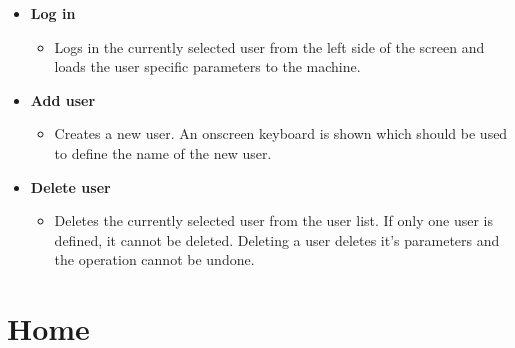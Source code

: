 \documentclass[12pt,a4paper,english]{uvmanual}
\begin{document}
\begin{itemize}
 \item \textbf{Log in}
  \begin{itemize}
  \item Logs in the currently selected user from the left side of the screen and loads the user specific parameters to the machine.
  \end{itemize}
 \item \textbf{Add user}
 \begin{itemize}
  \item Creates a new user. An onscreen keyboard is shown which should be used to define the name of the new user.
 \end{itemize}
 \item \textbf{Delete user}
 \begin{itemize}
  \item Deletes the currently selected user from the user list. If only one user is defined, it cannot be deleted. Deleting a user deletes it's parameters and the operation cannot be undone.
 \end{itemize}

\end{itemize}



\chapter{Home}\label{ch:home}

\end{document}
